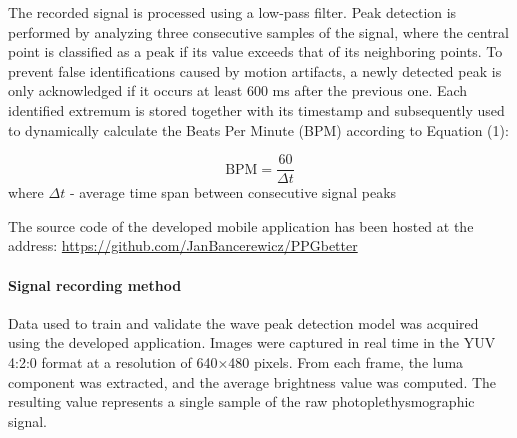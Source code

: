 \documentclass{citask}
\begin{document}
The recorded signal is processed using a low-pass filter. Peak detection is performed by analyzing three consecutive samples of the signal, where the central point is classified as a peak if its value exceeds that of its neighboring points. To prevent false identifications caused by motion artifacts, a newly detected peak is only acknowledged if it occurs at least 600 ms after the previous one. Each identified extremum is stored together with its timestamp and subsequently used to dynamically calculate the Beats Per Minute (BPM) according to Equation (1):

\begin{equation}
\text{BPM} = \frac{60}{\Delta t}
\label{eq:bpm}
\end{equation}
where $\Delta t$  - average time span between consecutive signal peaks

The source code of the developed mobile application has been hosted at the address:
\href{https://github.com/JanBancerewicz/PPGbetter}{https://github.com/JanBancerewicz/PPGbetter}

\paragraph{Signal recording method}
Data used to train and validate the wave peak detection model was acquired using the developed application. Images were captured in real time in the YUV 4:2:0 format at a resolution of 640×480 pixels. From each frame, the luma component was extracted, and the average brightness value was computed. The resulting value represents a single sample of the raw photoplethysmographic signal.
\end{document}
